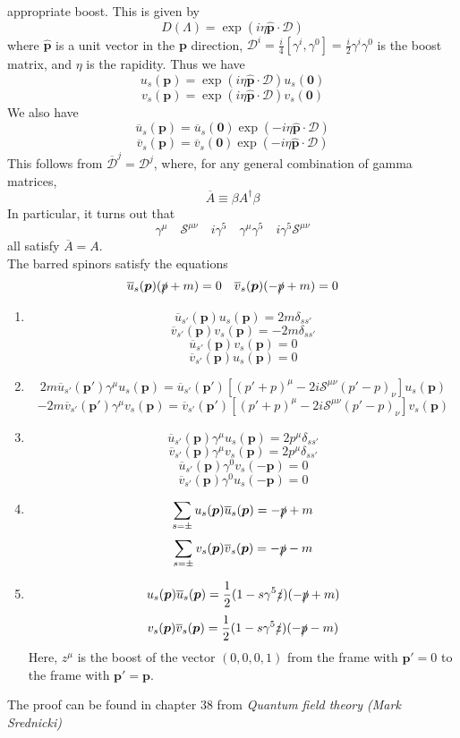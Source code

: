 appropriate boost. This is given by
\[D(\Lambda) = \exp(i\eta \hat{\bm{p}} \cdot \bm{\mathcal{D}})\]
where $\hat{\bm{p}}$ is a unit vector in the $\bm{p}$ direction, $\mathcal{D}^i = \frac{i}{4}[\gamma^i,\gamma^0] = \frac{i}{2} \gamma^i \gamma^0$ is the boost matrix, and $\eta$ is the rapidity. Thus we have
\[u_s(\bm{p}) = \exp(i\eta \hat{\bm{p}} \cdot \bm{\mathcal{D}}) u_s(\bm{0})\]
\[v_s(\bm{p}) = \exp(i\eta \hat{\bm{p}} \cdot \bm{\mathcal{D}}) v_s(\bm{0})\]
We also have
\[\overline{u}_s(\bm{p}) = \overline{u}_s(\bm{0}) \exp(-i\eta \hat{\bm{p}} \cdot \bm{\mathcal{D}}) \]
\[\overline{v}_s(\bm{p}) = \overline{v}_s(\bm{0}) \exp(-i\eta \hat{\bm{p}} \cdot \bm{\mathcal{D}}) \]
This follows from $\overline{\mathcal{D}}^j = \mathcal{D}^j$, where, for any general combination of gamma matrices,
\[\overline{A} \equiv \beta A^{\dagger} \beta\]
In particular, it turns out that
\[\gamma^{\mu} \quad \mathcal{S}^{\mu \nu} \quad i\gamma^5  \quad \gamma^{\mu}\gamma^5 \quad i\gamma^5 \mathcal{S}^{\mu \nu}\]
all satisfy $\overline{A} = A$.\\
The barred spinors satisfy the equations
\[\overline{u}_s(\bm{p})(\slashed{p}+m)=0 \quad \overline{v}_s(\bm{p})(-\slashed{p}+m)=0\]

\begin{newprop}
\begin{enumerate}
\item \[\overline{u}_{s'}(\bm{p}) u_s(\bm{p}) = 2m\delta_{ss'}\]
\[\overline{v}_{s'}(\bm{p}) v_s(\bm{p}) = -2m\delta_{ss'}\]
\[\overline{u}_{s'}(\bm{p}) v_s(\bm{p}) = 0\]
\[\overline{v}_{s'}(\bm{p}) u_s(\bm{p}) = 0\]
\item 
\[2m \overline{u}_{s'}(\bm{p}') \gamma^{\mu} u_s(\bm{p}) =  \overline{u}_{s'}(\bm{p}') [(p'+p)^{\mu} -2i \mathcal{S}^{\mu \nu}(p'-p)_{\nu}]u_s(\bm{p})\]
\[-2m \overline{v}_{s'}(\bm{p}') \gamma^{\mu} v_s(\bm{p}) =  \overline{v}_{s'}(\bm{p}') [(p'+p)^{\mu} -2i \mathcal{S}^{\mu \nu}(p'-p)_{\nu}]v_s(\bm{p})\]
\item   \[\overline{u}_{s'}(\bm{p}) \gamma^{\mu} u_s(\bm{p}) = 2p^{\mu} \delta_{ss'}\]
\[\overline{v}_{s'}(\bm{p}) \gamma^{\mu} v_s(\bm{p}) = 2p^{\mu} \delta_{ss'}\]
\[\overline{u}_{s'}(\bm{p}) \gamma^{0} v_s(-\bm{p}) = 0\]
\[\overline{v}_{s'}(\bm{p}) \gamma^{0} u_s(-\bm{p}) = 0\]
\item \[\sum_{s=\pm} u_s(\bm{p}) \overline{u}_s(\bm{p}) = - \slashed{p}+m \]
\[\sum_{s=\pm} v_s(\bm{p}) \overline{v}_s(\bm{p}) = - \slashed{p}-m \]
\item \[u_s(\bm{p}) \overline{u}_s(\bm{p}) =\frac{1}{2}(1-s\gamma^5\slashed{z})(-\slashed{p}+m)\]
 \[v_s(\bm{p}) \overline{v}_s(\bm{p}) =\frac{1}{2}(1-s\gamma^5\slashed{z})(-\slashed{p}-m)\]
Here, $z^{\mu}$ is the boost of the vector $(0,0,0,1)$ from the frame with $\bm{p}'=0$ to the frame with $\bm{p}'=\bm{p}$.  
\end{enumerate}
The proof can be found in chapter 38 from \emph{Quantum field theory (Mark Srednicki)}
\end{newprop}

